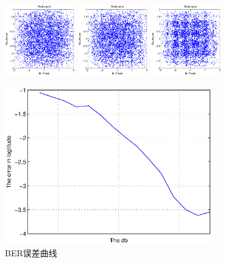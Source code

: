 \documentclass{article}
\begin{document}
\begin{figure}[h]
\begin{minipage}[t]{0.32\linewidth}
\centering
\includegraphics[width=1.2in]{71.eps}
\end{minipage}%
\begin{minipage}[t]{0.32\linewidth}
\centering
\includegraphics[width=1.2in]{72.eps}
\end{minipage}%
\begin{minipage}[t]{0.32\linewidth}
\centering
\includegraphics[width=1.2in]{75.eps}
\end{minipage}%
\end{figure}
\begin{figure}[h!]
\centering
\includegraphics[width=9cm]{8.eps}
\caption{BER误差曲线}
\end{figure}
\end{document}
